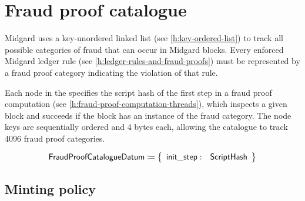 \documentclass[../midgard.tex]{subfiles}
\begin{document}
\section{Fraud proof catalogue}
\label{h:fraud-proof-catalogue}

Midgard uses a key-unordered linked list (see \cref{h:key-ordered-list}) to track all possible categories of fraud that can occur in Midgard blocks.
Every enforced Midgard ledger rule (see \cref{h:ledger-rules-and-fraud-proofs}) must be represented by a fraud proof category indicating the violation of that rule.

Each node in the  specifies the script hash of the first step in a fraud proof computation (see \cref{h:fraud-proof-computation-threads}), which inspects a given block and succeeds if the block has an instance of the fraud category.
The node keys are sequentially ordered and 4 bytes each, allowing the catalogue to track 4096 fraud proof categories.

\begin{align*}
    \mathsf{FraudProofCatalogueDatum} &\coloneq \left\{
    \begin{array}{ll}
        \mathsf{init\_step}  : & \mathsf{ScriptHash}
    \end{array} \right\} \\
\end{align*}

\subsection{Minting policy}
\label{h:fraud-proof-catalogue-minting-policy}
\end{document}
